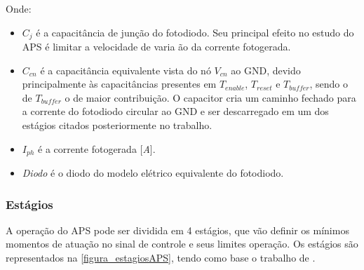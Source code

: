 \clearpage

Onde: 

\begin{itemize}
    \item $C_j$ \'e a capacit\^ancia de junção do fotodiodo. Seu principal efeito no estudo do APS \'e limitar a velocidade de varia ão da corrente fotogerada.
    
    \item $C_{cn}$ \'e a capacit\^ancia equivalente vista do n\'o $V_{cn}$ ao GND, devido principalmente às capacit\^ancias presentes em $T_{enable}$,  $T_{reset}$ e $T_{buffer}$, sendo o de $T_{buffer}$ o de maior contribuição. O capacitor cria um caminho fechado para a corrente do fotodiodo circular ao GND e ser descarregado em um dos est\'agios citados posteriormente no trabalho.
    
    \item $I_{ph}$ \'e a corrente fotogerada [\textit{A}].
    
    \item \textit{Diodo} \'e o diodo do modelo el\'etrico equivalente do fotodiodo.
\end{itemize}

\subsubsection{Est\'agios}
\label{estagiosAPS}

A operação do APS pode ser dividida em 4 est\'agios, que vão definir os m\'inimos momentos de  atuação no sinal de controle e seus limites operação. Os est\'agios são representados na \autoref{figura_estagiosAPS}, tendo como base o trabalho de \cite{LidianeCampos}.

